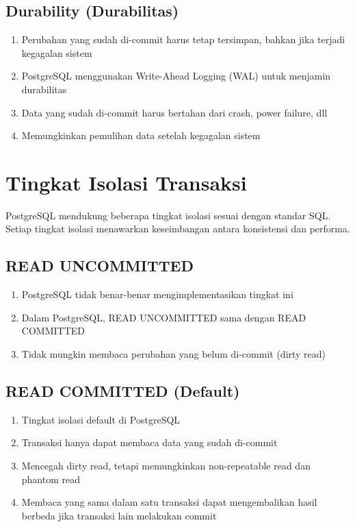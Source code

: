 \subsection{Durability (Durabilitas)}
\begin{enumerate}
    \item Perubahan yang sudah di-commit harus tetap tersimpan, bahkan jika terjadi kegagalan sistem
    \item PostgreSQL menggunakan Write-Ahead Logging (WAL) untuk menjamin durabilitas
    \item Data yang sudah di-commit harus bertahan dari crash, power failure, dll
    \item Memungkinkan pemulihan data setelah kegagalan sistem
\end{enumerate}

\section{Tingkat Isolasi Transaksi}

PostgreSQL mendukung beberapa tingkat isolasi sesuai dengan standar SQL. Setiap tingkat isolasi menawarkan keseimbangan antara konsistensi dan performa.

\subsection{READ UNCOMMITTED}
\begin{enumerate}
    \item PostgreSQL tidak benar-benar mengimplementasikan tingkat ini
    \item Dalam PostgreSQL, READ UNCOMMITTED sama dengan READ COMMITTED
    \item Tidak mungkin membaca perubahan yang belum di-commit (dirty read)
\end{enumerate}

\subsection{READ COMMITTED (Default)}
\begin{enumerate}
    \item Tingkat isolasi default di PostgreSQL
    \item Transaksi hanya dapat membaca data yang sudah di-commit
    \item Mencegah dirty read, tetapi memungkinkan non-repeatable read dan phantom read
    \item Membaca yang sama dalam satu transaksi dapat mengembalikan hasil berbeda jika transaksi lain melakukan commit
\end{enumerate}

